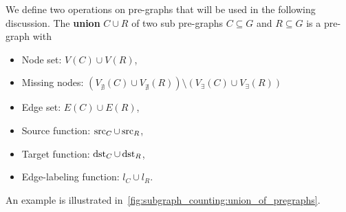 We define two operations on pre-graphs that will be used in the following discussion.
The \textbf{union} $C \cup R$ of two sub pre-graphs $C \subseteq G$ and $R \subseteq G$ is a pre-graph with 
\begin{itemize}
    \item Node set: $ V(C) \cup V(R) $,
    \item Missing nodes:
        $(
            V_{\nexists}(C) \cup V_{\nexists}(R)) \setminus 
            (   V_\exists(C) \cup 
             V_\exists(R)  
                   )$
    \item Edge set: $ E(C) \cup E(R) $, 
    \item Source function: $ \operatorname{src}_C \cup \operatorname{src}_R $,  
    \item Target function: $ \operatorname{dst}_C \cup \operatorname{dst}_R $,  
    \item Edge-labeling function: $ l_C \cup l_R $.   
\end{itemize} 
An example is illustrated in~\autoref{fig:subgraph_counting:union_of_pregraphs}.

